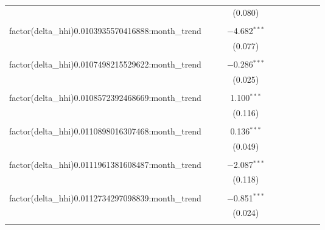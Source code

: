 \begin{table}[H]
{\begin{tabular}{@{\extracolsep{5pt}}lccccccccc}
   &  &  & (0.080) &  &  &  &  &  &  \\  

   & & & & & & & & & \\  

  factor(delta\_hhi)0.0103935570416888:month\_trend &  &  & $-$4.682$^{***}$ &  &  &  &  &  &  \\  

   &  &  & (0.077) &  &  &  &  &  &  \\  

   & & & & & & & & & \\  

  factor(delta\_hhi)0.0107498215529622:month\_trend &  &  & $-$0.286$^{***}$ &  &  &  &  &  &  \\  

   &  &  & (0.025) &  &  &  &  &  &  \\  

   & & & & & & & & & \\  

  factor(delta\_hhi)0.0108572392468669:month\_trend &  &  & 1.100$^{***}$ &  &  &  &  &  &  \\  

   &  &  & (0.116) &  &  &  &  &  &  \\  

   & & & & & & & & & \\  

  factor(delta\_hhi)0.0110898016307468:month\_trend &  &  & 0.136$^{***}$ &  &  &  &  &  &  \\  

   &  &  & (0.049) &  &  &  &  &  &  \\  

   & & & & & & & & & \\  

  factor(delta\_hhi)0.0111961381608487:month\_trend &  &  & $-$2.087$^{***}$ &  &  &  &  &  &  \\  

   &  &  & (0.118) &  &  &  &  &  &  \\  

   & & & & & & & & & \\  

  factor(delta\_hhi)0.0112734297098839:month\_trend &  &  & $-$0.851$^{***}$ &  &  &  &  &  &  \\  

   &  &  & (0.024) &  &  &  &  &  &  \\  

   & & & & & & & & & \\  


\end{tabular}}
\end{table}

